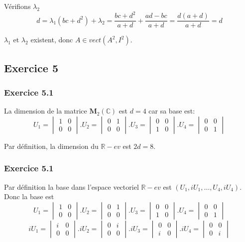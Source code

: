 \documentclass[]{book}
\theoremstyle{definition}
\newcommand{\bb}[1]{\mathbb{#1}}
\newcommand{\R}{\bb{R}}
\newcommand{\C}{\bb{C}}
\newcommand{\M}{\mathbf{M}}
\begin{document}
V\'erifions $\lambda_2$
$$
d = \lambda_1(bc+d^2) + \lambda_2 = \frac{bc+d^2}{a+d} + \frac{ad - bc}{a+d} = \frac{d(a+d)}{a+d} = d
$$

$\lambda_1$ et $\lambda_2$ existent, donc $A \in vect(A^2, I^2)$.


\subsection*{Exercice 5}
\subsubsection*{Exercice 5.1}
La dimension de la matrice $\M_2(\C)$ est $d=4$ car sa base est:
$$U_1 = \begin{vmatrix} 1 & 0 \\ 0 & 0 \end{vmatrix} . U_2 = \begin{vmatrix} 0 & 1 \\ 0 & 0 \end{vmatrix} . U_3 = \begin{vmatrix} 0 & 0 \\ 1 & 0 \end{vmatrix} . U_4 = \begin{vmatrix} 0 & 0 \\ 0 & 1 \end{vmatrix}$$

Par d\'efinition, la dimension du $\R-ev$ est $2d = 8$.

\subsubsection*{Exercice 5.1}
Par d\'efinition la base dans l'espace vectoriel $\R-ev$ est $(U_1, iU_1, \ldots, U_4, iU_4)$.
Donc la base est
$$U_1 = \begin{vmatrix} 1 & 0 \\ 0 & 0 \end{vmatrix} . U_2 = \begin{vmatrix} 0 & 1 \\ 0 & 0 \end{vmatrix} . U_3 = \begin{vmatrix} 0 & 0 \\ 1 & 0 \end{vmatrix} . U_4 = \begin{vmatrix} 0 & 0 \\ 0 & 1 \end{vmatrix}$$
$$iU_1 = \begin{vmatrix} i & 0 \\ 0 & 0 \end{vmatrix} . iU_2 = \begin{vmatrix} 0 & i \\ 0 & 0 \end{vmatrix} . iU_3 = \begin{vmatrix} 0 & 0 \\ i & 0 \end{vmatrix} . iU_4 = \begin{vmatrix} 0 & 0 \\ 0 & i \end{vmatrix}$$
\end{document}

